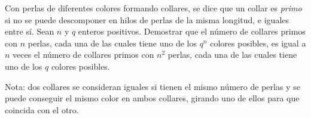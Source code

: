 Con perlas de diferentes colores formando collares, se dice que un collar es {\itshape primo} si no se puede descomponer en hilos de perlas de la misma longitud, e iguales entre sí. 
Sean $n$ y $q$ enteros positivos. Demostrar que el número de collares primos con $n$ perlas, cada una de las cuales tiene uno de los $q^n$ colores posibles, es igual a $n$ veces el número de collares primos con $n^2$ perlas, cada una de las cuales tiene uno de los $q$ colores posibles.

Nota: dos collares se consideran iguales si tienen el mismo número de perlas y se puede conseguir el mismo color en ambos collares, girando uno de ellos para que coincida con el otro.
